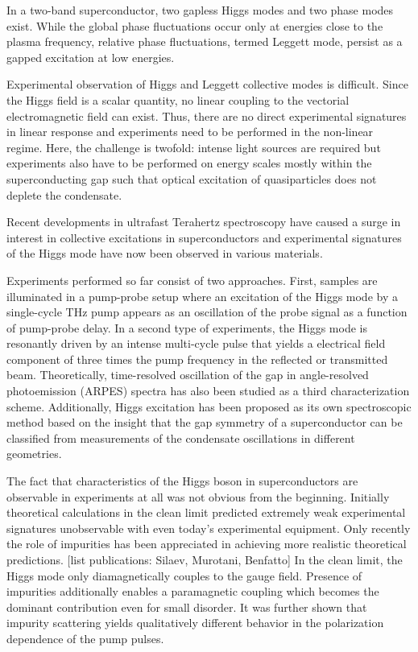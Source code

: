\documentclass[aps,prb,reprint,noeprint,superscriptaddress]{revtex4-1}
\begin{document}
In a two-band superconductor, two gapless Higgs modes and two phase modes exist.
While the global phase fluctuations occur only at energies close to the plasma
frequency, relative phase fluctuations, termed Leggett mode, 
persist as a gapped excitation at low energies.

Experimental observation of Higgs and Leggett collective modes is difficult.
Since the
Higgs field is a scalar quantity, no linear coupling to the vectorial
electromagnetic field can exist. Thus, there are no direct experimental signatures in
linear response and experiments need to be performed in the non-linear
regime. Here, the challenge is twofold: intense light sources are required
but experiments also have to be performed on energy scales mostly
within the superconducting gap such that optical excitation of quasiparticles does not deplete 
the condensate. 

Recent developments in ultrafast Terahertz spectroscopy have caused 
a surge in interest in collective excitations in superconductors and
experimental signatures of the Higgs mode have now been observed in various
materials.

Experiments performed so far consist of two approaches. First, samples are
illuminated in a pump-probe setup where
an excitation of the Higgs mode by a single-cycle THz pump appears as an oscillation of the
probe signal as a function of pump-probe delay. In a second type of experiments, 
the Higgs mode is resonantly driven
by an intense multi-cycle pulse that yields a electrical field
component of three times the pump frequency in the reflected or transmitted
beam. Theoretically, time-resolved oscillation of the gap in angle-resolved
photoemission (ARPES) spectra has also been studied as a third characterization
scheme. Additionally, Higgs excitation has been proposed as
its own spectroscopic method based on the insight that the gap symmetry of a
superconductor can be classified from measurements of the condensate
oscillations in different geometries.

The fact that characteristics of the Higgs boson in superconductors are
observable in experiments at all was not obvious from the beginning. Initially
theoretical calculations in the clean limit predicted extremely weak
experimental signatures unobservable with even today's experimental equipment.
Only recently the role of impurities has been appreciated in achieving more
realistic theoretical predictions. [list publications: Silaev, Murotani,
Benfatto] In the clean limit, the Higgs mode only
diamagnetically couples to the gauge field. Presence of impurities additionally enables
a paramagnetic coupling which becomes the dominant contribution even for small disorder. 
It was
further shown that impurity scattering yields qualitatively different behavior
in the polarization dependence of the pump pulses.
\end{document}
